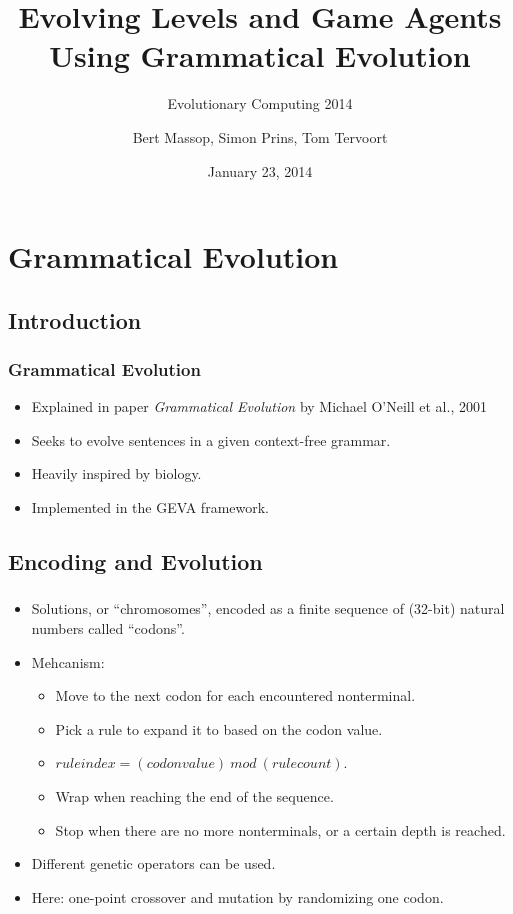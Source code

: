 \documentclass{beamer}
\title{Evolving Levels and Game Agents Using Grammatical Evolution}
\subtitle{Evolutionary Computing 2014}
\author{Bert Massop, Simon Prins, Tom Tervoort}
\date{January 23, 2014}
\makeatletter
\newcommand*{\currentname}{\@currentlabelname}
\makeatother
\begin{document}
\begin{frame}
\titlepage
\end{frame}

\section{Grammatical Evolution}
\subsection{Introduction}
\begin{frame}
\frametitle{Grammatical Evolution}
\begin{itemize}
\item Explained in paper \textit{Grammatical Evolution} by Michael O'Neill et al., 2001 \cite{o2001grammatical}
\item Seeks to evolve sentences in a given context-free grammar.
\item Heavily inspired by biology.
\item Implemented in the GEVA framework.
\end{itemize}
\end{frame}

\subsection{Encoding and Evolution}
\begin{frame}
\frametitle{\currentname}
\begin{itemize}
\item Solutions, or ``chromosomes'', encoded as a finite sequence of (32-bit) natural numbers called ``codons''.
\item Mehcanism:
\begin{itemize}
	\item Move to the next codon for each encountered nonterminal.
	\item Pick a rule to expand it to based on the codon value.
	\item $rule index = (codon value)\ mod\ (rule count)$.
	\item Wrap when reaching the end of the sequence.
	\item Stop when there are no more nonterminals, or a certain depth is reached.
\end{itemize}
\end{itemize}
\begin{itemize}
	\item Different genetic operators can be used.
	\item Here: one-point crossover and mutation by randomizing one codon.
\end{itemize}

\end{frame}
\end{document}
